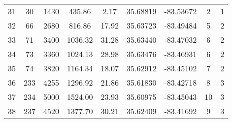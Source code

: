 \begin{table}[p]
\begin{tabular}{ccccccccc}
31 & 30                                                   & 1430                                                          & 435.86                                                       & 2.17   & 35.68819 & -83.53672 & 2                                                                                      & 1 \\ 
32 & 66                                                   & 2680                                                          & 816.86                                                       & 17.92 & 35.63723 & -83.49484 & 5                                                                                      & 2 \\ 
33 & 71                                                   & 3400                                                          & 1036.32                                                     & 31.28 & 35.63440 & -83.47032 & 6                                                                                      & 2 \\ 
34 & 73                                                   & 3360                                                          & 1024.13                                                     & 28.98 & 35.63476 & -83.46931 & 6                                                                                      & 2 \\ 
35 & 74                                                   & 3820                                                          & 1164.34                                                     & 18.07 & 35.62912 & -83.45102 & 7                                                                                      & 2 \\ 
36 & 233                                                 & 4255                                                          & 1296.92                                                     & 21.86 & 35.61830 & -83.42718 & 8                                                                                      & 3 \\ 
37 & 234                                                 & 5000                                                          & 1524.00                                                     & 23.93 & 35.60975 & -83.45043 & 10                                                                                    & 3 \\ 
38 & 237                                                 & 4520                                                          & 1377.70                                                     & 30.21 & 35.62409 & -83.41692 & 9                                                                                      & 3 \\ 

\end{tabular}
\end{table}
